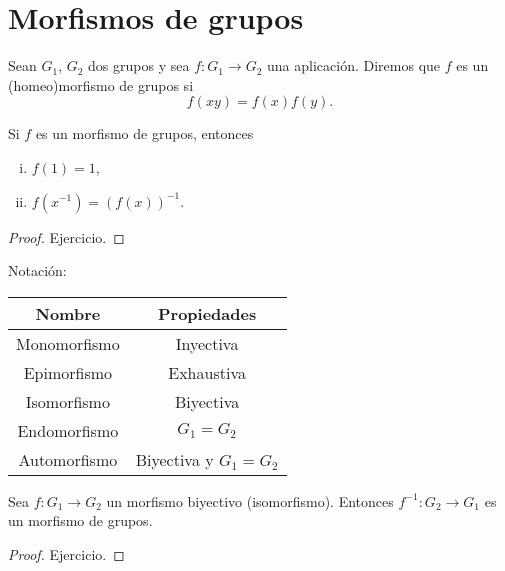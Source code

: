 \section{Morfismos de grupos}

\begin{defi}[homeomorfismo]
    Sean $G_1$, $G_2$ dos grupos y sea $f \colon G_1 \to G_2$ una aplicación. Diremos que $f$ es un
    (homeo)morfismo de grupos si
    \[
        f(xy) = f(x)f(y).
    \]
\end{defi}

\begin{prop}
    Si $f$ es un morfismo de grupos, entonces
    \begin{enumerate}[i)]
        \item $f(1) = 1$,
        \item $f\left( x^{-1} \right) = \left( f(x) \right)^{-1}$.
    \end{enumerate}
\end{prop}

\begin{proof}
    Ejercicio.
\end{proof}

\begin{obs}
    Notación:
    \begin{center}
        \begin{tabular}{|c|c|}
            \hline
            Nombre & Propiedades \\
            \hline\hline
            Monomorfismo & Inyectiva \\\hline
            Epimorfismo  & Exhaustiva \\\hline
            Isomorfismo  & Biyectiva \\\hline
            Endomorfismo & $G_1 = G_2$ \\\hline
            Automorfismo & Biyectiva y $G_1 = G_2$ \\
            \hline
        \end{tabular}
    \end{center}
\end{obs}

\begin{prop}
    Sea $f \colon G_1 \to G_2$ un morfismo biyectivo (isomorfismo). Entonces
    $f^{-1} \colon G_2 \to G_1$ es un morfismo de grupos.
\end{prop}

\begin{proof}
    Ejercicio.
\end{proof}

